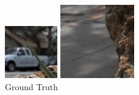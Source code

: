 \documentclass[10pt,twocolumn,letterpaper]{article}
\begin{document}
\begin{figure}[p]
\begin{multicols}{2}
\begin{multicols}{3}
            \includegraphics[width=\linewidth]{rock_crop_leaf/truth_05_05.png}\par\vspace{0.1in}\includegraphics[width=\linewidth]{rock_crop_walk/truth_05_05.png}\par\caption*{Ground Truth}

\end{multicols}
\end{multicols}
\end{figure}
\end{document}
